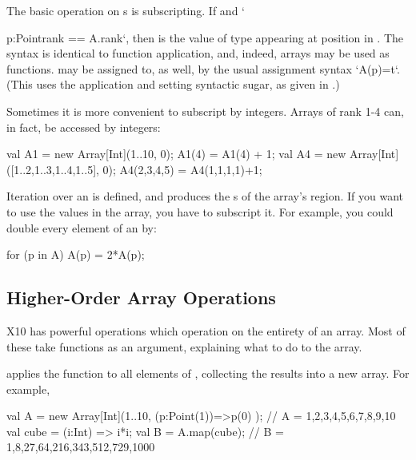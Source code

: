 The basic operation on s is subscripting.  If  and 
\xcd`{p:Point{rank == A.rank}`, then  is the value of type 
appearing at position  in .    The syntax is identical to
function application, and, indeed, arrays may be used as functions.
 may be assigned to, as well, by the usual assignment syntax
\xcd`A(p)=t`.
(This uses the application and setting syntactic sugar, as given in .)

Sometimes it is more convenient to subscript by integers.  Arrays of rank 1-4
can, in fact, be accessed by integers: 
\begin{xten}
val A1 = new Array[Int](1..10, 0);
A1(4) = A1(4) + 1;
val A4 = new Array[Int]([1..2,1..3,1..4,1..5], 0);
A4(2,3,4,5) = A4(1,1,1,1)+1;
\end{xten}



Iteration over an  is defined, and produces the s of the
array's region.  If you want to use the values in the array, you have to
subscript it.  For example, you could double every element of an
 by: 
\begin{xten}
for (p in A) A(p) = 2*A(p);
\end{xten}

\subsection{Higher-Order Array Operations}

X10 has powerful operations which operation on the entirety of an array. Most
of these take functions as an argument, explaining what to do to the array.

 applies the function  to all elements of ,
collecting the results into a new array.  For example, 
\begin{xten}
val A = new Array[Int](1..10, (p:Point(1))=>p(0) );
// A = 1,2,3,4,5,6,7,8,9,10
val cube = (i:Int) => i*i;
val B = A.map(cube);
// B = 1,8,27,64,216,343,512,729,1000
\end{xten}

}
